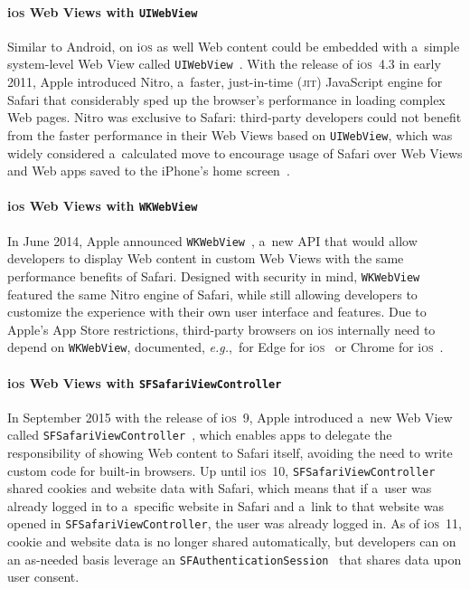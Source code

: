 \documentclass[sigconf]{acmart}
\begin{document}
\paragraph{i\textsc{os} Web Views with \texttt{UIWebView}}

Similar to Android, on i\textsc{os} as well Web content could be embedded with
a~simple system-level Web View called \texttt{UIWebView}~\cite{apple2018uiwebview}.
With the release of i\textsc{os}~4.3 in early 2011, Apple introduced Nitro,
a~faster, just-in-time (\textsc{jit}) JavaScript engine for Safari
that considerably sped up the browser's performance in loading complex Web pages.
Nitro was exclusive to Safari: third-party developers could not benefit
from the faster performance in their Web Views based on \texttt{UIWebView},
which was widely considered a~calculated move to encourage usage of Safari
over Web Views and Web apps saved to the iPhone's home screen~\cite{viticci2015safari}.

\paragraph{i\textsc{os} Web Views with \texttt{WKWebView}}

In June 2014, Apple announced \texttt{WKWebView}~\cite{apple2018wkwebview},
a~new API that would allow developers
to display Web content in custom Web Views with the same performance benefits of Safari.
Designed with security in mind, \texttt{WKWebView} featured the same Nitro engine of Safari,
while still allowing developers to customize the experience
with their own user interface and features.
Due to Apple's App Store restrictions, third-party browsers on i\textsc{os}
internally need to depend on \texttt{WKWebView}, documented,
\emph{e.g.},\ for Edge for i\textsc{os}~\cite{lyndersay2017edge}
or Chrome for i\textsc{os}~\cite{chromiumblog2016chrome}.

\paragraph{i\textsc{os} Web Views with \texttt{SFSafariViewController}}

In September 2015 with the release of i\textsc{os}~9, Apple introduced a~new Web View called
\texttt{SFSafariViewController}~\cite{apple2018sfsafariviewcontroller},
which enables apps to delegate the responsibility of showing Web content to Safari itself,
avoiding the need to write custom code for built-in browsers.
Up until i\textsc{os}~10, \texttt{SFSafariViewController}
shared cookies and website data with Safari,
which means that if a~user was already logged in to a~specific website in Safari
and a~link to that website was opened in \texttt{SFSafariViewController},
the user was already logged in.
As of i\textsc{os}~11, cookie and website data is no longer shared automatically,
but developers can on an as-needed basis leverage
an \texttt{SFAuthenticationSession}~\cite{apple2018sfauthenticationsession}
that shares data upon user consent. 
\end{document}
